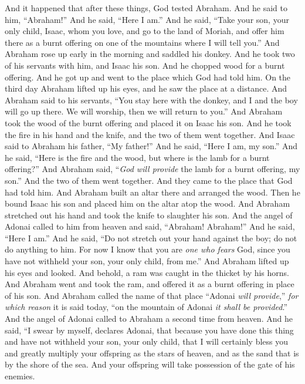 \begin{biblechapter} %
 And it happened that after these things, God tested Abraham. And he said to him, “Abraham!” And he said, “Here I am.”
\verse And he said, “Take your son, your only child, Isaac, whom you love, and go to the land of Moriah, and offer him there as a burnt offering on one of the mountains where I will tell you.”
\verse And Abraham rose up early in the morning and saddled his donkey. And he took two of his servants with him, and Isaac his son. And he chopped wood for a burnt offering. And he got up and went to the place which God had told him.
\verse On the third day Abraham lifted up his eyes, and he saw the place at a distance.
\verse And Abraham said to his servants, “You stay here with the donkey, and I and the boy will go up there. We will worship, then we will return to you.”
\verse And Abraham took the wood of the burnt offering and placed it on Isaac his son. And he took the fire in his hand and the knife, and the two of them went together.
\verse And Isaac said to Abraham his father, “My father!” And he said, “Here I am, my son.” And he said, “Here is the fire and the wood, but where is the lamb for a burnt offering?”
\verse And Abraham said, “\textit{God will provide} the lamb for a burnt offering, my son.” And the two of them went together.
\verse And they came to the place that God had told him. And Abraham built an altar there and arranged the wood. Then he bound Isaac his son and placed him on the altar atop the wood.
\verse And Abraham stretched out his hand and took the knife to slaughter his son.
\verse And the angel of Adonai called to him from heaven and said, “Abraham! Abraham!” And he said, “Here I am.”
\verse And he said, “Do not stretch out your hand against the boy; do not do anything to him. For now I know that you are \textit{one who fears} God, since you have not withheld your son, your only child, from me.”
\verse And Abraham lifted up his eyes and looked. And behold, a ram was caught in the thicket by his horns. And Abraham went and took the ram, and offered it as a burnt offering in place of his son.
\verse And Abraham called the name of that place “Adonai \textit{will provide},” \textit{for which reason} it is said today, “on the mountain of Adonai \textit{it shall be provided}.”
\verse And the angel of Adonai called to Abraham a second time from heaven.
\verse And he said, “I swear by myself, declares Adonai, that because you have done this thing and have not withheld your son, your only child,
\verse that I will certainly bless you and greatly multiply your offspring as the stars of heaven, and as the sand that is by the shore of the sea. And your offspring will take possession of the gate of his enemies.

\end{biblechapter}

